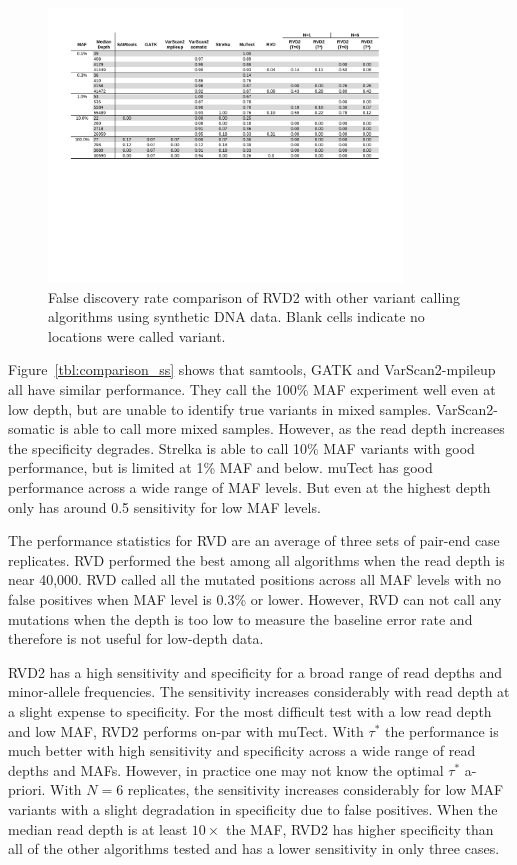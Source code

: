\documentclass{bioinfo}
\begin{document}
\begin{figure}[!tbhp]
\centering
\includegraphics[width=0.84\textwidth]{pdf_figs/comparison_table_fdr.pdf}
\caption{False discovery rate comparison of RVD2 with other variant calling algorithms using synthetic DNA data. Blank cells indicate no locations were called variant.}
\vspace{-15pt}
\label{tbl:comparison_fdr}
\end{figure}

Figure~\ref{tbl:comparison_ss} shows that samtools, GATK and VarScan2-mpileup all have similar performance. They call the 100\% MAF experiment well even at low depth, but are unable to identify true variants in mixed samples. VarScan2-somatic is able to call more mixed samples. However, as the read depth increases the specificity degrades. Strelka is able to call 10\% MAF variants with good performance, but is limited at 1\% MAF and below. muTect has good performance across a wide range of MAF levels. But even at the highest depth only has around 0.5 sensitivity for low MAF levels.

The performance statistics for RVD are an average of three sets of pair-end case replicates. RVD performed the best among all algorithms when the read depth is near 40,000. RVD called all the mutated positions across all MAF levels with no false positives when MAF level is 0.3\% or lower. However, RVD can not call any mutations when the depth is too low to measure the baseline error rate and therefore is not useful for low-depth data.

RVD2 has a high sensitivity and specificity for a broad range of read depths and minor-allele frequencies.  The sensitivity increases considerably with read depth at a slight expense to specificity. For the most difficult test with a low read depth and low MAF, RVD2 performs on-par with muTect. With $\tau^*$ the performance is much better with high sensitivity and specificity across a wide range of read depths and MAFs. However, in practice one may not know the optimal $\tau^*$ a-priori. With $N=6$ replicates, the sensitivity increases considerably for low MAF variants with a slight degradation in specificity due to false positives. When the median read depth is at least $10\times$ the MAF, RVD2 has higher specificity than all of the other algorithms tested and has a lower sensitivity in only three cases.
\end{document}
